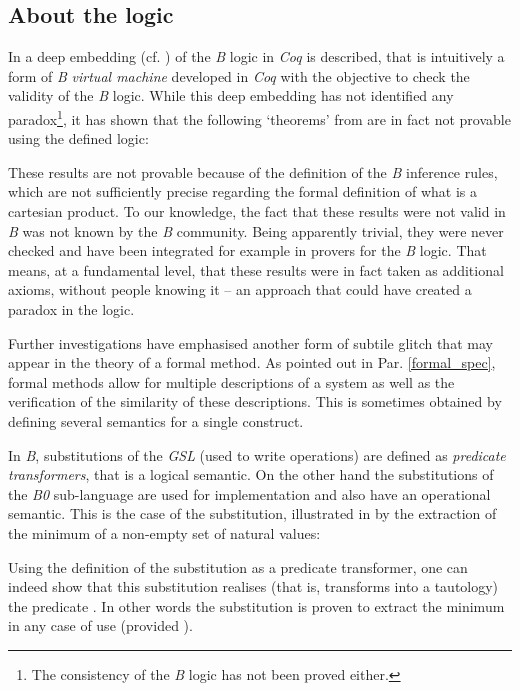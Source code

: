 \documentclass[conference]{IEEEtran}
\begin{document}
\subsection{About the logic}\label{logic_error}

In \cite{DBLP:conf/lpar/JaegerD07} a deep embedding (cf. \cite{gor:2,azu:1}) of the \emph{B}
logic in \emph{Coq} is described, that is intuitively a form of \emph{B}
\emph{virtual machine} developed in \emph{Coq} with the objective to check the validity of
the \emph{B} logic. While this deep embedding has not identified any paradox\footnote{The
consistency of the \emph{B} logic has not been proved either.}, it has shown that the
following `theorems' from \cite{abr:1} are in fact not provable using the defined logic:

These results are not provable because of the definition of the \emph{B} inference rules,
which are not sufficiently precise regarding the formal definition of what is a cartesian
product. To our knowledge, the fact that these results were not valid in \emph{B} was not
known by the \emph{B} community. Being apparently trivial, they were never checked and have
been integrated for example in provers for the \emph{B} logic. That means, at a fundamental
level, that these results were in fact taken as additional axioms, without people knowing it
-- an approach that could have created a paradox in the logic.

Further investigations have emphasised another form of subtile glitch that may appear in the
theory of a formal method. As pointed out  in Par. \ref{formal_spec}, formal methods allow for
multiple descriptions of a system as well as the verification of the similarity of these
descriptions. This is sometimes obtained by defining several semantics for a single construct.

In \emph{B}, substitutions of the \emph{GSL} (used to write operations) are defined as
\emph{predicate transformers}, that is a logical semantic. On the other hand the substitutions
of the \emph{B0} sub-language are used for implementation and also have an operational
semantic. This is the case of the
{\small} substitution,
illustrated in \cite{abr:1} by the extraction of the minimum of a non-empty set of natural
values:

Using the definition of the {\small} substitution as a predicate transformer, one
can indeed show that this substitution realises (that is, transforms into a tautology) the
predicate {\small}. In other words the substitution is proven to extract
the minimum in any case of use (provided {\small}).
\end{document}
